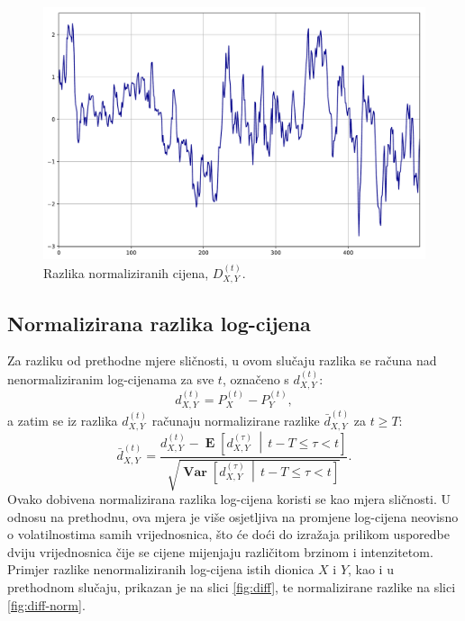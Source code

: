 \documentclass[lmodern, utf8, diplomski, numeric]{fer}
\newcommand{\Efromto}[2]{\operatorname{\mathbf{E}}\q[#1\, \middle\vert\, #2\w]}
\newcommand{\Varfromto}[2]{\operatorname{\mathbf{Var}}\q[#1\, \middle\vert\, #2\w]}
\newcommand{\norm}[1]{\bar{#1}}
\newcommand{\q}{\left}
\newcommand{\w}{\right}
\begin{document}
  \begin{figure}[p]
    \centering
    \includegraphics[width=1.0\linewidth]{graphics/ab-prices-norm-diff.pdf}
    \caption{
      Razlika normaliziranih cijena, $D_{X,Y}^{\q(t\w)}$.}
    \label{fig:ab-prices-norm-diff}
  \end{figure}
  
  \subsection{Normalizirana razlika log-cijena}
  Za razliku od prethodne mjere sličnosti, u ovom slučaju razlika se računa nad nenormaliziranim log-cijenama za sve $t$, označeno s $d_{X,Y}^{\q(t\w)}$:
  \begin{equation}
  d_{X,Y}^{\q(t\w)} = P_X^{\q(t\w)} - P_Y^{\q(t\w)},
  \end{equation}
  a zatim se iz razlika $d_{X,Y}^{\q(t\w)}$ računaju normalizirane razlike $\norm{d}_{X,Y}^{\q(t\w)}$ za $t \ge T$:
  \begin{equation}
  \norm{d}_{X,Y}^{\q(t\w)} = \frac{d_{X,Y}^{\q(t\w)} - \Efromto{d_{X,Y}^{(\tau)}}{t-T \le \tau < t}}{\sqrt{\Varfromto{d_{X,Y}^{(\tau)}}{t-T \le \tau < t}}}.
  \end{equation}
  Ovako dobivena normalizirana razlika log-cijena koristi se kao mjera sličnosti.
  U odnosu na prethodnu, ova mjera je više osjetljiva na promjene log-cijena neovisno o volatilnostima samih vrijednosnica, što će doći do izražaja prilikom usporedbe dviju vrijednosnica čije se cijene mijenjaju različitom brzinom i intenzitetom.
  Primjer razlike nenormaliziranih log-cijena istih dionica $X$ i $Y$, kao i u prethodnom slučaju, prikazan je na slici \ref{fig:diff}, te normalizirane razlike na slici \ref{fig:diff-norm}.
  
\end{document}
